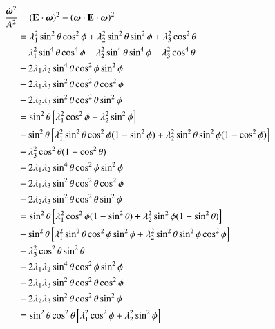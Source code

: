 \documentclass[preprint,12pt,authoryear]{elsarticle}
\newcommand{\mitbf}[1]{\hbox{\mathversion{bold}$#1$}}
\begin{document}
\begin{equation}
\begin{aligned}
\frac{\dot{\mitbf{\omega}}^2}{A^2}  &= 
 \left(\mathbf{E}\cdot \mitbf{\omega}\right)^2
 - \left(\mitbf{\omega} \cdot \mathbf{E} \cdot \mitbf{\omega} \right)^2  \\
&=
\lambda_1^2 \sin^2{\theta} \cos^2{\phi} + \lambda_2^2 \sin^2{\theta} \sin^2{\phi} + \lambda_3^2 \cos^2{\theta} \\
&-\lambda_1^2 \sin^4{\theta} \cos^4{\phi} - 
\lambda_2^2 \sin^4{\theta} \sin^4{\phi} -
\lambda_3^2 \cos^4{\theta} \\
&- 2 \lambda_1 \lambda_2 \sin^4{\theta} \cos^2{\phi}\sin^2{\phi} \\ 
&- 2 \lambda_1 \lambda_3 \sin^2{\theta} \cos^2{\theta} \cos^2{\phi} \\
&- 2 \lambda_2 \lambda_3 \sin^2{\theta} \cos^2{\theta} \sin^2{\phi} \\ 
&=
\sin^2{\theta} \left[\lambda_1^2 \cos^2{\phi} + \lambda_2^2 \sin^2{\phi} \right] \\
&- \sin^2{\theta} \left[ \lambda_1^2 \sin^2{\theta} \cos^2{\phi}(1-\sin^2{\phi}) + \lambda_2^2 \sin^2{\theta} \sin^2{\phi}(1-\cos^2{\phi}) \right] \\
&+ \lambda_3^2 \cos^2{\theta}(1-\cos^2{\theta}) \\
&- 2 \lambda_1 \lambda_2 \sin^4{\theta} \cos^2{\phi}\sin^2{\phi} \\ 
&- 2 \lambda_1 \lambda_3 \sin^2{\theta} \cos^2{\theta} \cos^2{\phi} \\
&- 2 \lambda_2 \lambda_3 \sin^2{\theta} \cos^2{\theta} \sin^2{\phi} \\ 
&=
\sin^2{\theta} \left[\lambda_1^2 \cos^2{\phi} (1 - \sin^2{\theta}) + \lambda_2^2 \sin^2{\phi} (1-\sin^2{\theta}) \right] \\
&+ \sin^2{\theta} \left[ \lambda_1^2 \sin^2{\theta} \cos^2{\phi}\sin^2{\phi} + \lambda_2^2 \sin^2{\theta} \sin^2{\phi}\cos^2{\phi} \right] \\
&+ \lambda_3^2 \cos^2{\theta}\sin^2{\theta} \\
&- 2 \lambda_1 \lambda_2 \sin^4{\theta} \cos^2{\phi}\sin^2{\phi} \\ 
&- 2 \lambda_1 \lambda_3 \sin^2{\theta} \cos^2{\theta} \cos^2{\phi} \\
&- 2 \lambda_2 \lambda_3 \sin^2{\theta} \cos^2{\theta} \sin^2{\phi} \\ 
&=
\sin^2{\theta}\cos^2{\theta} \left[\lambda_1^2 \cos^2{\phi} + \lambda_2^2 \sin^2{\phi} \right] \\

\end{aligned}
\end{equation}
\end{document}
